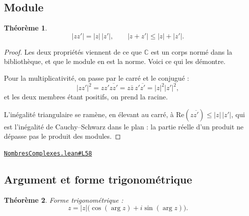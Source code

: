 \documentclass[11pt,a4paper]{article}
\theoremstyle{definition}
\theoremstyle{plain}
\newtheorem{theoreme}{Théorème}
\newcommand{\source}[2]{\par\smallskip\noindent\hfill{\footnotesize\href{#1}{\texttt{#2}}}\par\smallskip}
\begin{document}
\subsection{Module}

\begin{theoreme}
\[ |zz'| = |z|\,|z'| , \qquad |z + z'| \le |z| + |z'| . \]
\end{theoreme}

\begin{proof}
Les deux propriétés viennent de ce que $\mathbb{C}$ est un corps normé dans la bibliothèque,
et que le module en est la norme. Voici ce qui les démontre.

Pour la multiplicativité, on passe par le carré et le conjugué :
\[ |zz'|^2 = zz'\overline{zz'} = z\bar z\, z'\overline{z'} = |z|^2 |z'|^2 , \]
et les deux membres étant positifs, on prend la racine.

L'inégalité triangulaire se ramène, en élevant au carré, à
$\mathrm{Re}(z\overline{z'}) \le |z|\,|z'|$, qui est l'inégalité de Cauchy--Schwarz dans le
plan : la partie réelle d'un produit ne dépasse pas le produit des modules.
\end{proof}
\source{https://github.com/Commutator-IO/learn-lean/blob/main/courses/02-lycee/07-nombres-complexes/NombresComplexes.lean\#L58}{NombresComplexes.lean\#L58}

\subsection{Argument et forme trigonométrique}

\begin{theoreme}
Forme trigonométrique :
\[ z = |z|\bigl(\cos(\arg z) + i \sin(\arg z)\bigr) . \]
\end{theoreme}
\end{document}

